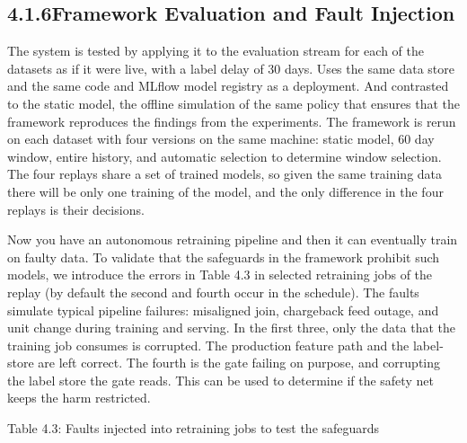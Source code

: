 \documentclass[11pt,letterpaper]{report}
\begin{document}
\subsection*{4.1.6\quad Framework Evaluation and Fault Injection}

The system is tested by applying it to the evaluation stream for each of the datasets as if it were live, with a label delay of 30 days. Uses the same data store and the same code and MLflow model registry as a deployment. And contrasted to the static model, the offline simulation of the same policy that ensures that the framework reproduces the findings from the experiments. The framework is rerun on each dataset with four versions on the same machine: static model, 60 day window, entire history, and automatic selection to determine window selection. The four replays share a set of trained models, so given the same training data there will be only one training of the model, and the only difference in the four replays is their decisions.

Now you have an autonomous retraining pipeline and then it can eventually train on faulty data. To validate that the safeguards in the framework prohibit such models, we introduce the errors in Table 4.3 in selected retraining jobs of the replay (by default the second and fourth occur in the schedule). The faults simulate typical pipeline failures: misaligned join, chargeback feed outage, and unit change during training and serving. In the first three, only the data that the training job consumes is corrupted. The production feature path and the label-store are left correct. The fourth is the gate failing on purpose, and corrupting the label store the gate reads. This can be used to determine if the safety net keeps the harm restricted.

\begin{center}\small Table 4.3: Faults injected into retraining jobs to test the safeguards\end{center}
\vspace{-1.2em}
\end{document}
